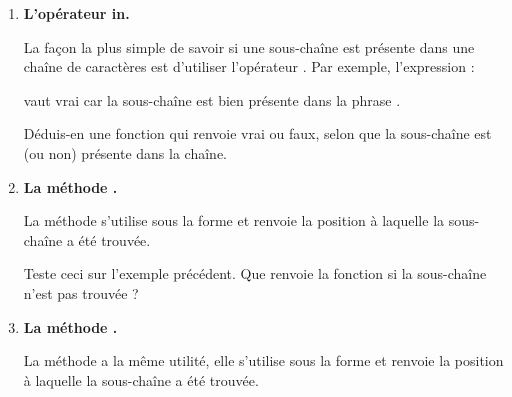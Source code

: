 \documentclass[11pt,class=report,crop=false]{standalone}
\begin{document}





\begin{activite}[Chercher]


\begin{enumerate}
  \item \textbf{L'opérateur \og{}in\fg{}.}
  
  
  La façon la plus simple de savoir si une sous-chaîne est présente dans une chaîne de caractères est d'utiliser l'opérateur \og{}\fg{}. Par exemple, l'expression :\\
  \centerline{}
  vaut \og{}vrai\fg{} car la sous-chaîne  est bien présente dans la phrase
  . 
  
  Déduis-en une fonction  qui renvoie \og{}vrai\fg{} ou \og{}faux\fg{}, selon que la sous-chaîne est (ou non) présente dans la chaîne.
  
  \item \textbf{La méthode .}
  
  
  La méthode  s'utilise sous la forme  et renvoie la position à laquelle la sous-chaîne a été trouvée. 
  
  Teste ceci sur l'exemple précédent. Que renvoie la fonction si la sous-chaîne n'est pas trouvée ?
 
   \item \textbf{La méthode .}
  
  
  La méthode  a la même utilité, elle s'utilise sous la forme  et renvoie la position à laquelle la sous-chaîne a été trouvée. 


\end{enumerate}
\end{activite}
\end{document}
